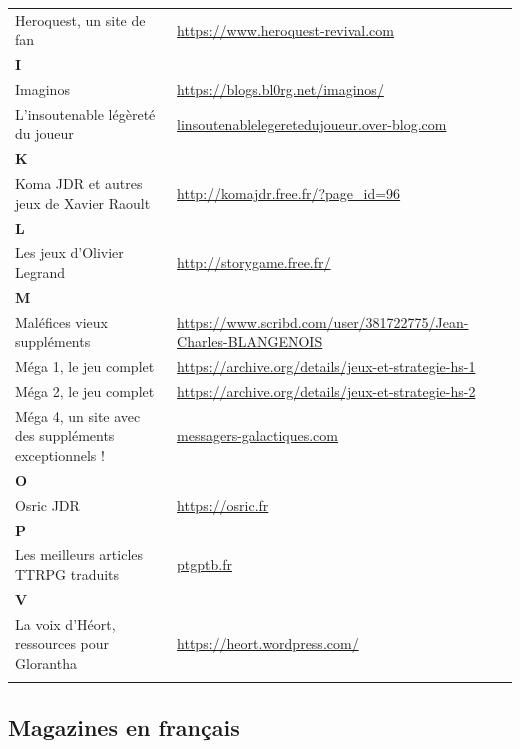 \documentclass[a4paper, 11pt, twoside]{article}
\begin{document}
\begin{longtable}{p{7cm}p{7cm}}
Heroquest, un site de fan & \url{https://www.heroquest-revival.com}\\
\textbf{I} & \\
Imaginos & \url{https://blogs.bl0rg.net/imaginos/}\\
L'insoutenable légèreté du joueur & \href{http://linsoutenablelegeretedujoueur.over-blog.com/}{linsoutenablelegeretedujoueur.over-blog.com}\\
\textbf{K} & \\
Koma JDR et autres jeux de Xavier Raoult & \url{http://komajdr.free.fr/?page\_id=96}\\
\textbf{L} & \\
Les jeux d'Olivier Legrand & \url{http://storygame.free.fr/}\\
\textbf{M} & \\
Maléfices vieux suppléments & \url{https://www.scribd.com/user/381722775/Jean-Charles-BLANGENOIS}\\
Méga 1, le jeu complet & \url{https://archive.org/details/jeux-et-strategie-hs-1}\\
Méga 2, le jeu complet & \url{https://archive.org/details/jeux-et-strategie-hs-2}\\
Méga 4, un site avec des suppléments exceptionnels ! & \href{https://www.messagers-galactiques.com}{messagers-galactiques.com}\\
\textbf{O} & \\
Osric JDR & \url{https://osric.fr}\\
\textbf{P} & \\
Les meilleurs articles TTRPG traduits & \href{https://ptgptb.fr}{ptgptb.fr}\\
\textbf{V} & \\
La voix d'Héort, ressources pour Glorantha & \url{https://heort.wordpress.com/}\\
 & \\
\end{longtable}

\subsection{Magazines en français}
\label{sec:orgdf56750}
\end{document}
